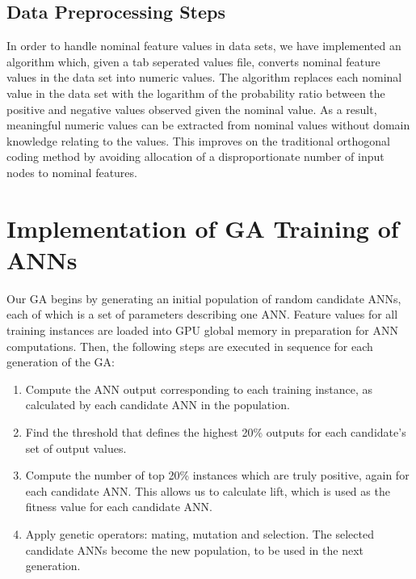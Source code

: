 \documentclass[11pt]{article}       %
\begin{document}
\subsection{Data Preprocessing Steps} \label{preprocessing}
In order to handle nominal feature values in data sets, we have implemented an algorithm which, given a tab seperated values file, converts nominal feature values in the data set into numeric values.  The algorithm replaces each nominal value in the data set with the logarithm of the probability ratio between the positive and negative values observed given the nominal value.  As a result, meaningful numeric values can be extracted from nominal values without domain knowledge relating to the values. This improves on the traditional orthogonal coding method \cite[slide 17]{MLP-NominalCoding} by avoiding allocation of a disproportionate number of input nodes to nominal features.

\section{Implementation of GA Training of ANNs} \label{algimp}

Our GA begins by generating an initial population of random candidate ANNs, each of which is a set of parameters describing one ANN. Feature values for all training instances are loaded into GPU global memory in preparation for ANN computations. Then, the following steps are executed in sequence for each generation of the GA:

\begin{enumerate}
	\item Compute the ANN output corresponding to each training instance, as calculated by each candidate ANN in the population.
	\item Find the threshold that defines the highest 20\% outputs for each candidate's set of output values.
	\item Compute the number of top 20\% instances which are truly positive, again for each candidate ANN. This allows us to calculate lift, which is used as the fitness value for each candidate ANN.
	\item Apply genetic operators: mating, mutation and selection. The selected candidate ANNs become the new population, to be used in the next generation.
\end{enumerate}
\end{document}
